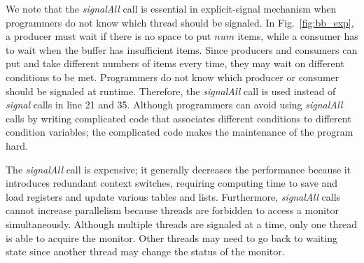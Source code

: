 \documentclass{sigplanconf}
\begin{document}
We note that the {\em signalAll} call is essential in explicit-signal mechanism when programmers
do not know which thread should be signaled. In Fig.~\ref{fig:bb_exp}, a 
producer must wait if there is no space to put $num$ items, while a consumer 
has to wait when the buffer has insufficient items.
Since producers and consumers can put and take different numbers of items
every time, they may wait on different conditions to be met. Programmers 
do not know which producer or consumer should be signaled at runtime. 
Therefore, the {\em signalAll} call is used instead of {\em signal} calls in
line 21 and 35.
Although programmers can avoid using {\em signalAll} calls by writing
complicated code that associates different conditions to different condition 
variables; the complicated code makes the maintenance of the program
hard. 



The {\em signalAll} call is expensive; it generally decreases the performance 
because it introduces redundant context switches, requiring 
computing time to save and load registers and update various tables and lists.
Furthermore, {\em signalAll} calls cannot increase parallelism because threads
are forbidden to access a monitor simultaneously. Although multiple threads are
signaled at a time, only one thread is able to acquire the monitor. Other 
threads may need to go back to waiting state since another thread may change 
the status of the monitor. 

\end{document}
